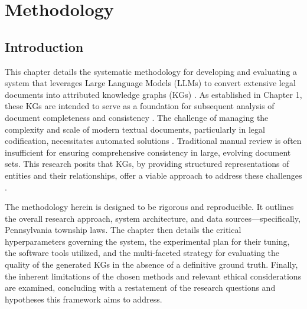 \chapter{Methodology}
\label{chap:methodology}

\section{Introduction}
This chapter details the systematic methodology for developing and evaluating a system that leverages Large Language Models (LLMs) to convert extensive legal documents into attributed knowledge graphs (KGs) \parencite{RefWorks:RefID:102-hogan2021knowledge, RefWorks:RefID:120-fensel2020knowledge}. As established in Chapter 1, these KGs are intended to serve as a foundation for subsequent analysis of document completeness and consistency \parencite{RefWorks:RefID:10-zowghi2003interplay, RefWorks:RefID:29-umar2024advances}. The challenge of managing the complexity and scale of modern textual documents, particularly in legal codification, necessitates automated solutions \parencite{RefWorks:RefID:165-bhattacharya2019comparative}. Traditional manual review is often insufficient for ensuring comprehensive consistency in large, evolving document sets. This research posits that KGs, by providing structured representations of entities and their relationships, offer a viable approach to address these challenges \parencite{RefWorks:RefID:121-zhong2024comprehensive}.

The methodology herein is designed to be rigorous and reproducible. It outlines the overall research approach, system architecture, and data sources—specifically, Pennsylvania township laws. The chapter then details the critical hyperparameters governing the system, the experimental plan for their tuning, the software tools utilized, and the multi-faceted strategy for evaluating the quality of the generated KGs in the absence of a definitive ground truth. Finally, the inherent limitations of the chosen methods and relevant ethical considerations are examined, concluding with a restatement of the research questions and hypotheses this framework aims to address.

